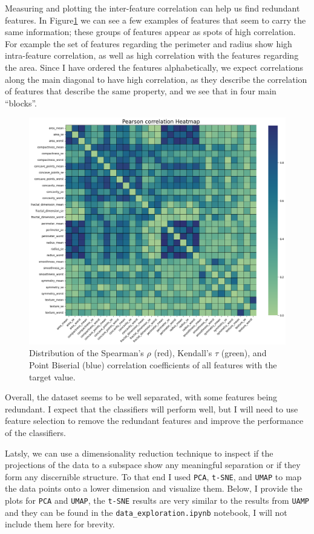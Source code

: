 \documentclass[12pt]{article}
\begin{document}
Measuring and plotting the inter-feature correlation can help us find redundant
features. In Figure\ref{fig:corr_coeffs_heatmap} we can see a few examples of
features that seem to carry the same information; these groups of features
appear as spots of high correlation. For example the set of features regarding
the perimeter and radius show high intra-feature correlation, as well as high
correlation with the features regarding the area. Since I have ordered the
features alphabetically, we expect correlations along the main diagonal to
have high correlation, as they describe the correlation of features that
describe the same property, and we see that in four main ``blocks''.

\begin{figure}[H]
    \centering
    \includegraphics[width=\textwidth]{ims/corr_coeffs_heatmap.png}
    \caption{Distribution of the Spearman's $\rho$ (red), Kendall's $\tau$
    (green), and Point Biserial (blue) correlation coefficients of all features
    with the target value.}
    \label{fig:corr_coeffs_heatmap}
\end{figure}

Overall, the dataset seems to be well separated, with some features being
redundant. I expect that the classifiers will perform well, but I will need to
use feature selection to remove the redundant features and improve the
performance of the classifiers.

Latsly, we can use a dimensionality reduction technique to inspect if the
projections of the data to a subspace show any meaningful separation or if they
form any discernible structure. To that end I used \texttt{PCA}, \texttt{t-SNE},
and \texttt{UMAP} to map the data points onto a lower dimension and visualize
them. Below, I provide the plots for \texttt{PCA} and \texttt{UMAP}, the
\texttt{t-SNE} results are very similar to the results from \texttt{UAMP} and
they can be found in the \texttt{data\_exploration.ipynb} notebook, I will not
include them here for brevity.
\end{document}
